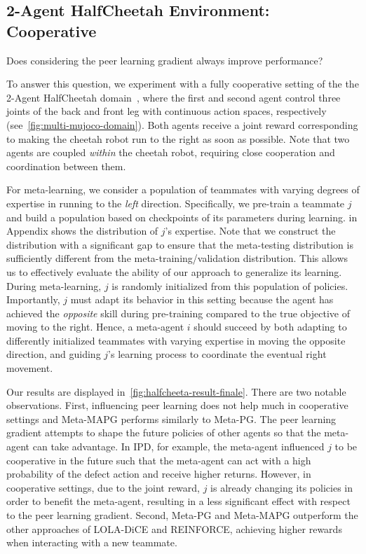 \subsection{2-Agent HalfCheetah Environment: Cooperative}
\begin{question}
Does considering the peer learning gradient always improve performance? \\[-2em]
\end{question}
To answer this question, we experiment with a fully cooperative setting of the the 2-Agent HalfCheetah domain~\citep{dewitt2020deep_multimujoco}, where the first and second agent control three joints of the back and front leg with continuous action spaces, respectively (see~\cref{fig:multi-mujoco-domain}). 
Both agents receive a joint reward corresponding to making the cheetah robot run to the right as soon as possible.
Note that two agents are coupled \textit{within} the cheetah robot, requiring close cooperation and coordination between them.

For meta-learning, we consider a population of teammates with varying degrees of expertise in running to the \textit{left} direction. 
Specifically, we pre-train a teammate $j$ and build a population based on checkpoints of its parameters during learning. 
 in Appendix shows the distribution of $j$'s expertise. Note that we construct the distribution with a significant gap to ensure that the meta-testing distribution is sufficiently different from the meta-training/validation distribution. This allows us to effectively evaluate the ability of our approach to generalize its learning.
During meta-learning, $j$ is randomly initialized from this population of policies. 
Importantly, $j$ must adapt its behavior in this setting because the agent has achieved the \textit{opposite} skill during pre-training compared to the true objective of moving to the right. 
Hence, a meta-agent $i$ should succeed by both adapting to differently initialized teammates with varying expertise in moving the opposite direction, and guiding $j$'s learning process to coordinate the eventual right movement. 

Our results are displayed in~\cref{fig:halfcheeta-result-finale}. There are two notable observations. First, influencing peer learning does not help much in cooperative settings and Meta-MAPG performs similarly to Meta-PG.
The peer learning gradient attempts to shape the future policies of other agents so that the meta-agent can take advantage. In IPD, for example, the meta-agent influenced $j$ to be cooperative in the future such that the meta-agent can act with a high probability of the defect action and receive higher returns. 
However, in cooperative settings, due to the joint reward, $j$ is already changing its policies in order to benefit the meta-agent, resulting in a less significant effect with respect to the peer learning gradient. 
Second, Meta-PG and Meta-MAPG outperform the other approaches of LOLA-DiCE and REINFORCE, achieving higher rewards when interacting with a new teammate. 


